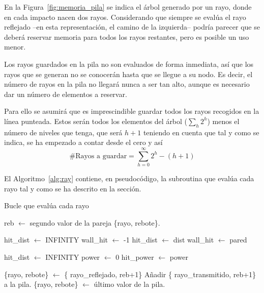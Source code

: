 En la Figura~\ref{fig:memoria_pila} se indica el árbol generado por un rayo, donde en cada impacto nacen dos rayos.
Considerando que siempre se evalúa el rayo reflejado --en esta representación, el camino de la izquierda-- podría parecer que se deberá reservar memoria para todos los rayos restantes, pero es posible un uso menor.

Los rayos guardados en la pila no son evaluados de forma inmediata, así que los rayos que se generan no se conocerán hasta que se llegue a su nodo.
Es decir, el número de rayos en la pila no llegará nunca a ser tan alto, aunque es necesario dar un número de elementos a reservar.

Para ello se asumirá que es imprescindible guardar todos los rayos recogidos en la línea punteada.
Estos serán todos los elementos del árbol ($\sum_h 2^h$) menos el número de niveles que tenga, que será $h+1$ teniendo en cuenta que tal y como se indica, se ha empezado a contar desde el cero y así
\begin{equation}
    \text{\# Rayos a guardar} = \sum_{h=0}^{\infty} 2^h - (h+1)
\end{equation}

El Algoritmo~\ref{alg:ray} contiene, en pseudocódigo, la subroutina que evalúa cada rayo tal y como se ha descrito en la sección.

\begin{algorithm}
    \caption{Bucle que evalúa cada rayo}
    \label{alg:ray}
    \begin{algorithmic}[1]
        
            \State reb $\gets$ segundo valor de la pareja \{rayo, rebote\}.

                \State hit\_dist $\gets$ INFINITY
                \State wall\_hit $\gets$ -1
                        \State hit\_dist $\gets$ dist
                        \State wall\_hit $\gets$ pared
                    \EndIf
                \EndIf
            \EndFor

                \State hit\_dist $\gets$ INFINITY
                \State power $\gets$ 0
                        \State hit\_power $\gets$ power
                    \EndIf
                \EndIf
            \EndFor

                \State \{rayo, rebote\} $\gets$ \{ rayo\_reflejado, reb+1\}
                \State Añadir \{ rayo\_transmitido, reb+1\} a la pila.
            \Else
                \State \{rayo, rebote\} $\gets$ último valor de la pila.
            \EndIf
        \EndWhile
    \end{algorithmic}
\end{algorithm}

